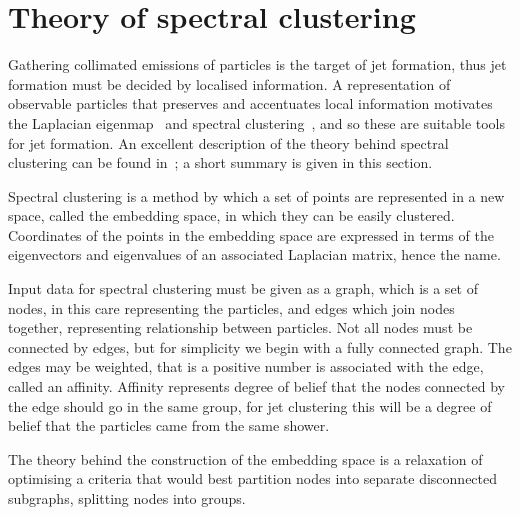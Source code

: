 \section{Theory of spectral clustering}\label{sec:spectral_theory}
Gathering collimated emissions of particles is the target of jet formation,
thus jet formation must be decided by localised information.
A representation of observable particles that preserves and accentuates local information
motivates the Laplacian eigenmap~\cite{Belkin:2003_unfound4} and spectral
clustering~\cite{Ng:2001_unfound543},
and so these are suitable tools for jet formation.
An excellent description of the theory behind spectral clustering
can be found in~\cite{UlrikevonLuxburg:2007_unfound52}; a short
summary is given in this section.

Spectral clustering is a method by which a set of points are represented in a new space,
called the embedding space, in which they can be easily clustered.
Coordinates of the
points in the embedding space are expressed in terms of the eigenvectors and eigenvalues
of an associated Laplacian matrix, hence the name.

Input data for spectral clustering must be given as a graph,
which is a set of nodes, in this care representing the particles,
and edges which join nodes together, representing relationship between particles.
Not all nodes must be connected by edges, 
but for simplicity we begin with a fully connected graph.
The edges may be weighted, that is a positive number is associated with the edge,
called an affinity.
Affinity represents degree of belief that the nodes connected by the edge should go in the same group,
for jet clustering this will be a degree of belief that the particles came from the same shower.

The theory behind the
construction of the embedding space is a relaxation
of optimising a criteria that would best 
partition nodes into separate disconnected subgraphs,
splitting nodes into groups.

